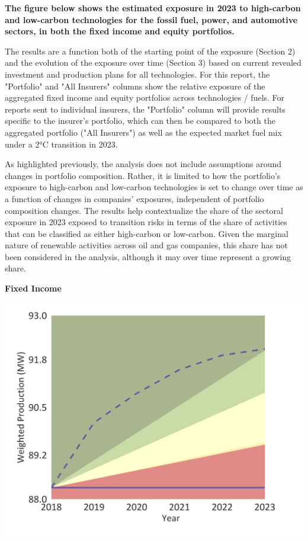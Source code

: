 \documentclass[10pt,table,a4]{article}\usepackage[]{graphicx}\usepackage[]{color}
\begin{document}
	\begin{multicols}{2}
		\textbf{The figure below shows the estimated exposure in 2023 to high-carbon and low-carbon technologies for the fossil fuel, power, and automotive sectors, in both the fixed income and equity portfolios. }
		
		The results are a function both of the starting point of the exposure (Section 2) and the evolution of the exposure over time (Section 3) based on current revealed investment and production plans for all technologies. For this report, the "Portfolio" and "All Insurers" columns show the relative exposure of the aggregated fixed income and equity portfolios across technologies / fuels. For reports sent to individual insurers, the "Portfolio" column will provide results specific to the insurer's portfolio, which can then be compared to both the aggregated portfolio ("All Insurers") as well as the expected market fuel mix under a 2°C transition in 2023. 
		
		As highlighted previously, the analysis does not include assumptions around changes in portfolio composition. Rather, it is limited to how the portfolio's  exposure to high-carbon and low-carbon technologies is set to change over time as a function of changes in companies’ exposures, independent of portfolio composition changes. The results help contextualize the share of the sectoral exposure in 2023 exposed to transition risks in terms of the share of activities that can be classified as either high-carbon or low-carbon. Given the marginal nature of renewable activities across oil and gas companies, this share has not been considered in the analysis, although it may over time represent a growing share. 
		
		
	\end{multicols}
	
	\textbf{Fixed Income}
	
	
	\begin{center}
		\includegraphics[trim = {0 0cm 0 0},width=1\linewidth]{CAFigures/Fig10}
	\end{center}
	
\end{document}
